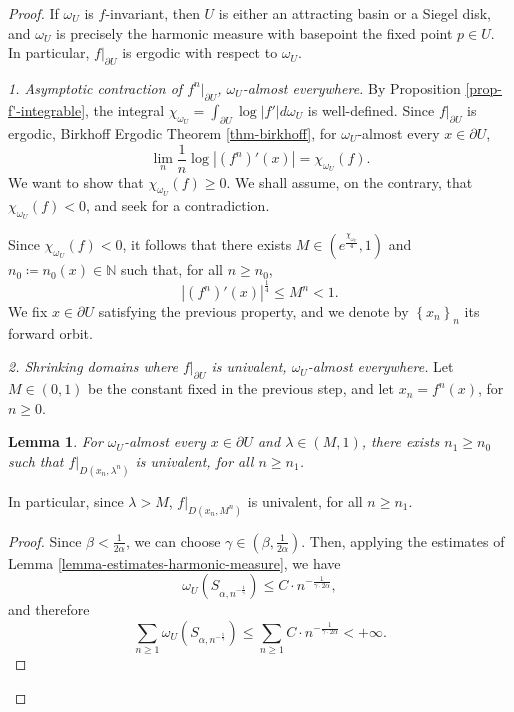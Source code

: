 \documentclass[11pt]{article}
\newtheorem{sublemma}[claim]{Lemma}
\theoremstyle{definition}
\theoremstyle{remark}
\newcounter{main}
\theoremstyle{plain}
\begin{document}
\begin{proof}
	If $ \omega_U $ is $ f $-invariant, then $ U $ is either an attracting basin or a Siegel disk, and $ \omega_U $ is precisely the harmonic measure with basepoint the fixed point  $ p\in U $. In particular, $ f|_{\partial U} $ is ergodic with respect to $ \omega_U $.
	
	\vspace{0.3cm}
	\noindent
	{\em 1.  Asymptotic contraction of $ f^n|_{\partial U} $, $ \omega_U $-almost everywhere.}
	By Proposition \ref{prop-f'-integrable}, the integral $\chi_{\omega_U}=\int_{\partial U}\log \left| f'\right| d\omega_U$ is well-defined. Since $ f|_{\partial U} $ is ergodic, Birkhoff Ergodic Theorem \ref{thm-birkhoff}, for $ \omega_U $-almost every $ x\in\partial U $, \[\lim\limits_n \frac{1}{n}\log \left| (f^n)'(x)\right| =\chi_{\omega_U}(f).\] We want to show that $  \chi_{\omega_U}(f)\geq 0$. We shall assume, on the contrary, that $  \chi_{\omega_U}(f)< 0$, and seek for a contradiction.
	
	Since $  \chi_{\omega_U}(f)< 0$, it follows that there exists $ M\in (e^{\frac{\chi_{\omega_U}}{4}}, 1) $ and $ n_0\coloneqq n_0(x) \in\mathbb{N}$ such that, for all $ n\geq n_0 $, \[\left| (f^n)'(x)\right| ^\frac{1}{4}\leq M^n<1.\]
	We fix $ x\in \partial U $ satisfying the previous property, and we denote by $ \left\lbrace x_n\right\rbrace _n $ its forward orbit.
	
	\vspace{0.3cm}
	\noindent
	{\em 2. Shrinking domains where $ f|_{\partial U} $ is univalent, $ \omega_U $-almost everywhere.}
	Let $ M \in (0,1)$ be the constant fixed in the previous step, and let $ x_n=f^n(x) $, for $ n\geq 0 $.
	
	\begin{sublemma}\label{lemma-univalent}
		For $ \omega_U $-almost every $ x\in\partial U $ and $ \lambda\in (M,1) $, there exists $ n_1\geq n_0 $ such that $ f|_{D(x_n, \lambda^n)} $ is univalent, for all $ n\geq n_1 $.
	\end{sublemma}
	In particular, since $ \lambda>M $, $ f|_{D(x_n, M^n)} $ is univalent, for all $ n\geq n_1 $.
	
	\begin{proof}
		Since $ \beta<\frac{1}{2\alpha} $, we can choose $ \gamma\in (\beta, \frac{1}{2\alpha}) $. Then, applying the estimates of Lemma \ref{lemma-estimates-harmonic-measure}, we have 
		\[\omega_U\left( S_{\alpha, n^{-\frac{1}{\gamma}}}\right) \leq C\cdot n^{-\frac{1}{\gamma\cdot 2\alpha}},\] and therefore \[ \sum_{n\geq 1}\omega_U\left( S_{\alpha, n^{-\frac{1}{\gamma}}}\right)\leq \sum_{n\geq 1} C\cdot n^{-\frac{1}{\gamma\cdot 2\alpha}} <+\infty.\]
		

\end{proof}
\end{proof}
\end{document}
